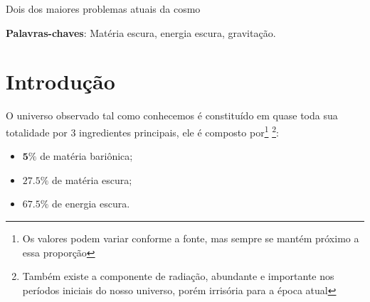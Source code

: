 \documentclass[
	article,			%
	11pt,				%
	twoside,			%
	a4paper,			%
	english,			%
	brazil,				%
	sumario=tradicional
	]{abntex2}
\begin{document}
\frenchspacing


%
%
\maketitle

\begin{resumoumacoluna}
 Dois dos maiores problemas atuais da cosmo

 \vspace{\onelineskip}

 \noindent
 \textbf{Palavras-chaves}: Matéria escura, energia escura, gravitação.
\end{resumoumacoluna}


\textual

\section*{Introdução}


O universo observado tal como conhecemos é constituído em quase toda sua totalidade por 3 ingredientes principais, ele é composto por\footnote{Os valores podem variar conforme a fonte, mas sempre se mantém próximo a essa proporção} \footnote{Também existe a componente de radiação, abundante e importante nos períodos iniciais do nosso universo, porém irrisória para a época atual}:

\begin{itemize}
	\item $\bm{5\%}$ de matéria bariônica;
	\item $\bm{27.5\%}$ de matéria escura;
	\item $\bm{67.5\%}$ de energia escura.
\end{itemize}
\end{document}
